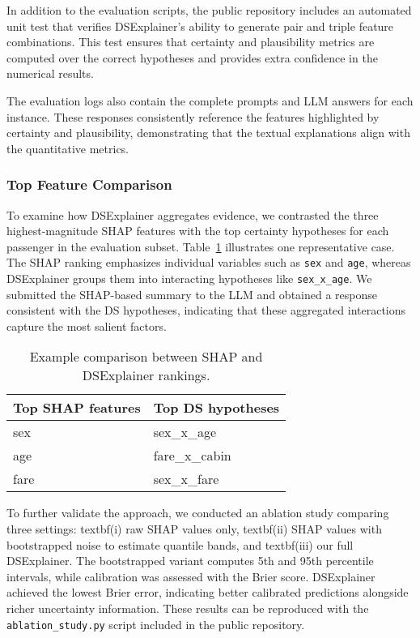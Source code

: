 \documentclass[acmlarge]{acmart}
\begin{document}
In addition to the evaluation scripts, the public repository includes an automated unit test that verifies DSExplainer's ability to generate pair and triple feature combinations. This test ensures that certainty and plausibility metrics are computed over the correct hypotheses and provides extra confidence in the numerical results.

The evaluation logs also contain the complete prompts and LLM answers for each instance. These responses consistently reference the features highlighted by certainty and plausibility, demonstrating that the textual explanations align with the quantitative metrics.

\subsubsection{Top Feature Comparison}
To examine how DSExplainer aggregates evidence, we contrasted the three highest-magnitude SHAP features with the top certainty hypotheses for each passenger in the evaluation subset. Table~\ref{tab:shap_vs_ds} illustrates one representative case. The SHAP ranking emphasizes individual variables such as \texttt{sex} and \texttt{age}, whereas DSExplainer groups them into interacting hypotheses like \texttt{sex\_x\_age}. We submitted the SHAP-based summary to the LLM and obtained a response consistent with the DS hypotheses, indicating that these aggregated interactions capture the most salient factors.

\begin{table}[H]
    \caption{Example comparison between SHAP and DSExplainer rankings.}
    \label{tab:shap_vs_ds}
    \centering
    \begin{tabular}{|l|l|}
        \hline
        Top SHAP features & Top DS hypotheses \\
        \hline
        sex  & sex\_x\_age \\
        age  & fare\_x\_cabin \\
        fare & sex\_x\_fare \\
        \hline
    \end{tabular}
\end{table}

To further validate the approach, we conducted an ablation study comparing three settings: textbf{(i) raw SHAP values only}, textbf{(ii) SHAP values with bootstrapped noise} to estimate quantile bands, and textbf{(iii) our full DSExplainer}. The bootstrapped variant computes 5th and 95th percentile intervals, while calibration was assessed with the Brier score. DSExplainer achieved the lowest Brier error, indicating better calibrated predictions alongside richer uncertainty information.
These results can be reproduced with the \texttt{ablation\_study.py} script included in the public repository.
\end{document}
